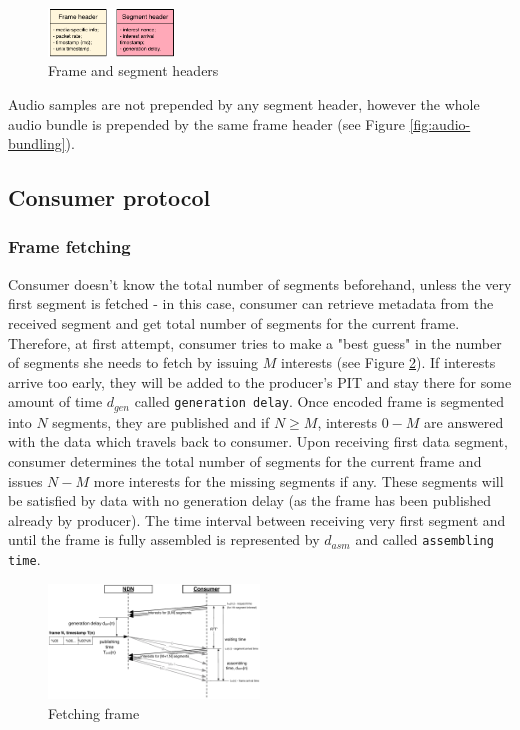\documentclass[10pt]{icn/sig-alternate-10pt} %
\begin{document}
\begin{figure}[t!]
\centering
\includegraphics[width=0.3\textwidth]{data-struct}
\caption{Frame and segment headers}
\label{fig:data-struct}
\end{figure}

Audio samples are not prepended by any segment header, however the whole audio bundle is prepended by the same frame header (see Figure \ref{fig:audio-bundling}).

\subsection{Consumer protocol}

\subsubsection{Frame fetching}

Consumer doesn't know the total number of segments beforehand, unless the very first segment is fetched - in this case, consumer can retrieve metadata from the received segment and get total number of segments for the current frame. 
Therefore, at first attempt, consumer tries to make a "best guess" in the number of segments she needs to fetch by issuing $M$ interests (see Figure \ref{fig:pull}). If interests arrive too early, they will be added to the producer's PIT and stay there for some amount of time $d_{gen}$ called \texttt{generation delay}. Once encoded frame is segmented into $N$ segments, they are published and if $N\geq M$, interests $0 - M$ are answered with the data  which travels back to consumer. Upon receiving first data segment, consumer determines the total number of segments for the current frame and issues $N - M$ more interests for the missing segments if any. These segments will be satisfied by data with no generation delay (as the frame has been published already by producer). The time interval between receiving very first segment and until the frame is fully assembled is represented by $d_{asm}$ and called \texttt{assembling time}.

\begin{figure}[t!]
\centering
\includegraphics[width=0.5\textwidth]{frame-fetch}
\caption{Fetching frame}
\label{fig:pull}
\end{figure}
\end{document}
